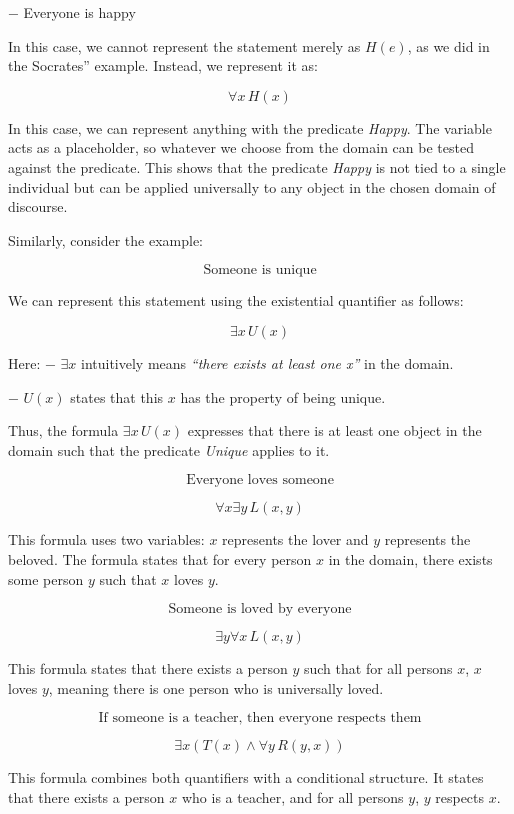 − Everyone is happy

In this case, we cannot represent the statement merely as \(H(e)\), as
we did in the Socrates'' example. Instead, we represent it as:

\[\forall x \, H(x)\]

In this case, we can represent anything with the predicate \emph{Happy}.
The variable acts as a placeholder, so whatever we choose from the
domain can be tested against the predicate. This shows that the
predicate \emph{Happy} is not tied to a single individual but can be
applied universally to any object in the chosen domain of discourse.

Similarly, consider the example:

\[\text{Someone is unique}\]

We can represent this statement using the existential quantifier as
follows:

\[\exists x \, U(x)\]

Here: − \(\exists x\) intuitively means \emph{``there exists at least
one x''} in the domain.

− \(U(x)\) states that this \(x\) has the property of being unique.

Thus, the formula \(\exists x \, U(x)\) expresses that there is at least
one object in the domain such that the predicate \emph{Unique} applies
to it.

\[\text{Everyone loves someone}\]

\[\forall x \exists y \, L(x,y)\]

This formula uses two variables: \(x\) represents the lover and \(y\)
represents the beloved. The formula states that for every person \(x\)
in the domain, there exists some person \(y\) such that \(x\) loves
\(y\).

\[\text{Someone is loved by everyone}\]

\[\exists y \forall x \, L(x,y)\]

This formula states that there exists a person \(y\) such that for all
persons \(x\), \(x\) loves \(y\), meaning there is one person who is
universally loved.

\[\text{If someone is a teacher, then everyone respects them}\]

\[\exists x (T(x) \land \forall y \, R(y,x))\]

This formula combines both quantifiers with a conditional structure. It
states that there exists a person \(x\) who is a teacher, and for all
persons \(y\), \(y\) respects \(x\).

